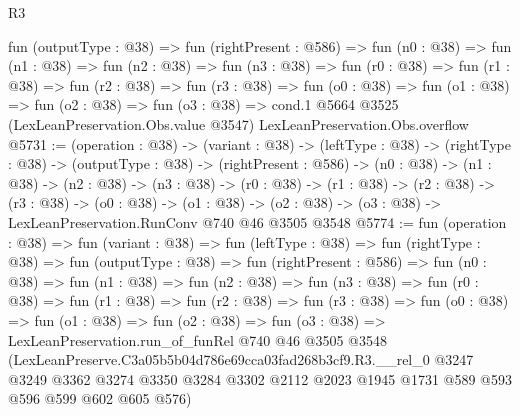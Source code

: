 \begin{lexlean}{R3}
\begin{coremodule}
  fun (outputType : @38) =>
  fun (rightPresent : @586) =>
  fun (n0 : @38) =>
  fun (n1 : @38) =>
  fun (n2 : @38) =>
  fun (n3 : @38) =>
  fun (r0 : @38) =>
  fun (r1 : @38) =>
  fun (r2 : @38) =>
  fun (r3 : @38) =>
  fun (o0 : @38) =>
  fun (o1 : @38) =>
  fun (o2 : @38) =>
  fun (o3 : @38) =>
  cond.{1} @5664 @3525 (LexLeanPreservation.Obs.value @3547) LexLeanPreservation.Obs.overflow
@5731 := (operation : @38) ->
  (variant : @38) ->
  (leftType : @38) ->
  (rightType : @38) ->
  (outputType : @38) ->
  (rightPresent : @586) ->
  (n0 : @38) ->
  (n1 : @38) ->
  (n2 : @38) ->
  (n3 : @38) ->
  (r0 : @38) ->
  (r1 : @38) ->
  (r2 : @38) ->
  (r3 : @38) ->
  (o0 : @38) ->
  (o1 : @38) -> (o2 : @38) -> (o3 : @38) -> LexLeanPreservation.RunConv @740 @46 @3505 @3548
@5774 := fun (operation : @38) =>
  fun (variant : @38) =>
  fun (leftType : @38) =>
  fun (rightType : @38) =>
  fun (outputType : @38) =>
  fun (rightPresent : @586) =>
  fun (n0 : @38) =>
  fun (n1 : @38) =>
  fun (n2 : @38) =>
  fun (n3 : @38) =>
  fun (r0 : @38) =>
  fun (r1 : @38) =>
  fun (r2 : @38) =>
  fun (r3 : @38) =>
  fun (o0 : @38) =>
  fun (o1 : @38) =>
  fun (o2 : @38) =>
  fun (o3 : @38) =>
  LexLeanPreservation.run_of_funRel
    @740
    @46
    @3505
    @3548
    (LexLeanPreserve.C3a05b5b04d786e69cca03fad268b3cf9.R3.__rel_0
      @3247
      @3249
      @3362
      @3274
      @3350
      @3284
      @3302
      @2112
      @2023
      @1945
      @1731
      @589
      @593
      @596
      @599
      @602
      @605
      @576)
\end{coremodule}
\end{lexlean}
